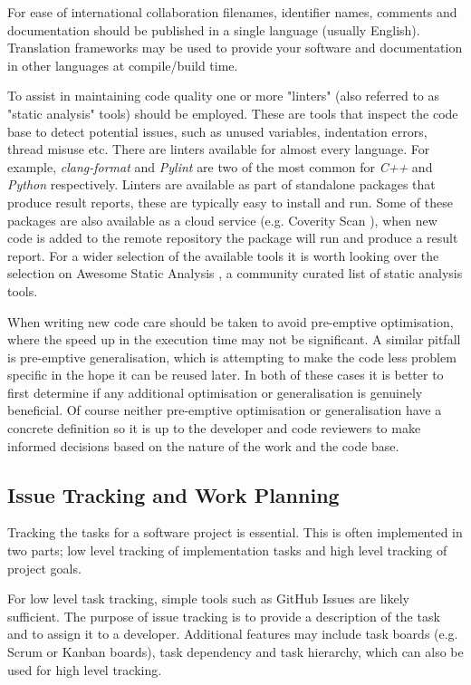 \documentclass[jnr]{iosart2x}
\begin{document}
For ease of international collaboration filenames, identifier names, comments and documentation should be published in a single language (usually English).
Translation frameworks may be used to provide your software and documentation in other languages at compile/build time.

To assist in maintaining code quality one or more "linters" (also referred to as "static analysis" tools) should be employed.
These are tools that inspect the code base to detect potential issues, such as unused variables, indentation errors, thread misuse etc.
There are linters available for almost every language.
For example, {\it clang-format} \cite{Clang} and {\it Pylint} \cite{Pylint} are two of the most common for {\it C++} and {\it Python} respectively.
Linters are available as part of standalone packages that produce result reports, these are typically easy to install and run.
Some of these packages are also available as a cloud service (e.g. Coverity Scan \cite{coverity}), when new code is added to the remote repository the package will run and produce a result report.
For a wider selection of the available tools it is worth looking over the selection on Awesome Static Analysis \cite{awesome_static_analysis}, a community curated list of static analysis tools.

When writing new code care should be taken to avoid pre-emptive optimisation, where the speed up in the execution time may not be significant.
A similar pitfall is pre-emptive generalisation, which is attempting to make the code less problem specific in the hope it can be reused later.
In both of these cases it is better to first determine if any additional optimisation or generalisation is genuinely beneficial.
Of course neither pre-emptive optimisation or generalisation have a concrete definition so it is up to the developer and code reviewers to make informed decisions based on the nature of the work and the code base.

\subsection{Issue Tracking and Work Planning}
\label{Issue tracking and work planning}

Tracking the tasks for a software project is essential.
This is often implemented in two parts; low level tracking of implementation tasks and high level tracking of project goals.

For low level task tracking, simple tools such as GitHub Issues are likely sufficient.
The purpose of issue tracking is to provide a description of the task and to assign it to a developer.
Additional features may include task boards (e.g. Scrum or Kanban boards), task dependency and task hierarchy, which can also be used for high level tracking.
\end{document}
